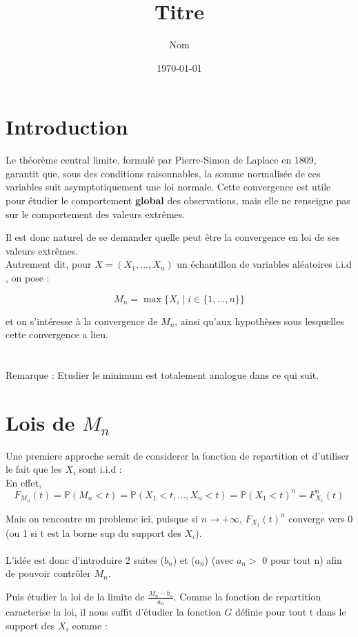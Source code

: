 \documentclass{article}
\title{Titre}
\author{Nom}
\date{\today}
\begin{document}
\maketitle 
\newpage
\section{Introduction} 

Le théorème central limite, formulé par Pierre-Simon de Laplace en 1809, garantit que, sous des conditions raisonnables, la somme normalisée de ces variables suit asymptotiquement une loi normale. Cette convergence est utile pour étudier le comportement \textbf{global} des observations, mais elle ne renseigne pas sur le comportement des valeurs extrêmes.

Il est donc naturel de se demander quelle peut être la convergence en loi de ses valeurs extrêmes. 
\\
Autrement dit, pour \( X = (X_1, ..., X_n) \) un échantillon de variables aléatoires i.i.d , on pose :


\[
M_n = \max\{X_i \mid i \in \{1, ..., n\} \}
\]

et on s'intéresse à la convergence de \( M_n \), ainsi qu'aux hypothèses sous lesquelles cette convergence a lieu.
\\
\\
\\
Remarque : Etudier le minimum est totalement analogue dans ce qui suit.

\section{Lois de $M_n$} 

Une premiere approche serait de considerer la fonction de repartition et d'utiliser le fait que les $X_i$ sont i.i.d :
\\
En effet,
\[
F_{M_n}(t) = \mathbb{P}(M_n < t) = \mathbb{P}(X_1 < t,...,X_n <t)=\mathbb{P}(X_1<t)^n = F_{X_1}^n(t) 
\]

Mais on rencontre un probleme ici, puisque si $n\to + \infty$, $F_{X_1}(t)^n$ converge vers 0 (ou 1 si t est la borne sup du support des $X_i$).
\\
\\
L'idée est donc d'introduire 2 suites ($b_n$) et ($a_n$) (avec $a_n > $  0 pour tout n) afin de pouvoir contrôler $M_n$.

Puis étudier la loi de la limite de $\frac{M_n - b_n}{a_n}$. Comme la fonction de repartition caracterise la loi, il nous suffit d'étudier la fonction $G$ définie pour tout t dans le support des $X_i$ comme :
\end{document}
